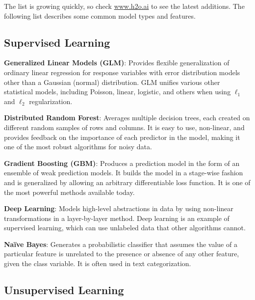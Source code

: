 {{\begin{minipage}{\textwidth}
\begin{frame}
\begin{tabular}{p{5.5cm}p{5.5cm}}
\end{tabular}

\end{frame}
\end{minipage}

The list is growing quickly, so check \url{www.h2o.ai} to see the latest additions. The following list describes some common model types and features. 

\subsection{Supervised Learning}

{\textbf{Generalized Linear Models (GLM)}}: Provides flexible generalization of ordinary linear regression for response variables with error distribution models other than a Gaussian (normal) distribution. GLM unifies various other statistical models, including Poisson, linear, logistic, and others when using $\ell_1$ and $\ell_2$ regularization.

{\textbf{Distributed Random Forest}}: Averages multiple decision trees, each created on different random samples of rows and columns. It is easy to use, non-linear, and provides feedback on the importance of each predictor in the model, making it one of the most robust algorithms for noisy data.

{\textbf{Gradient Boosting (GBM)}}: Produces a prediction model in the form of an ensemble of weak prediction models. It builds the model in a stage-wise fashion and is generalized by allowing an arbitrary differentiable loss function. It is one of the most powerful methods available today.

{\textbf{Deep Learning}}: Models high-level abstractions in data by using non-linear transformations in a layer-by-layer method. Deep learning is an example of supervised learning, which can use unlabeled data that other algorithms cannot.

{\textbf{Na\"{i}ve Bayes}}: Generates a probabilistic classifier that assumes the value of a particular feature is unrelated to the presence or absence of any other feature, given the class variable. It is often used in text categorization.

\subsection{Unsupervised Learning}

}}
